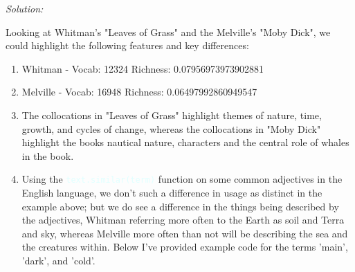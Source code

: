 \documentclass[11pt]{article}
\newenvironment{solution}{
	\vspace{10px}\noindent\emph{Solution:}
}{
	\vspace{10px}
}
\newcommand{\codeword}[1]{
	\texttt{\textcolor{lightCyan}{#1}}
}
\begin{document}
\begin{solution}
	
	Looking at Whitman's "Leaves of Grass" and the Melville's "Moby Dick", we could highlight the following features and key differences: 
	
	\begin{enumerate}
		
		\item Whitman - Vocab:  12324  Richness:  0.07956973973902881
		
		\item Melville - Vocab:  16948  Richness:  0.06497992860949547
		
		\item The collocations in "Leaves of Grass" highlight themes of nature, time, growth, and cycles of change, whereas the collocations in "Moby Dick" highlight the books nautical nature, characters and the central role of whales in the book.
		
		\item Using the \codeword{text.similar(term)} function on some common adjectives in the English language, we don't such a difference in usage as distinct in the example above; but we do see a difference in the things being described by the adjectives, Whitman referring more often to the Earth as soil and Terra and sky, whereas Melville more often than not will be describing the sea and the creatures within. Below I've provided example code for the terms 'main', 'dark', and 'cold'.
	
	\end{enumerate}
	

\end{solution}
\end{document}
